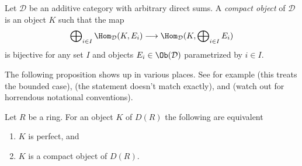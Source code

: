 \begin{definition}
\label{definition-compact-object}
Let $\mathcal{D}$ be an additive category with arbitrary direct
sums. A {\it compact object} of $\mathcal{D}$ is an object $K$
such that the map
$$
\bigoplus\nolimits_{i \in I} \Hom_{\mathcal{D}}(K, E_i)
\longrightarrow
\Hom_{\mathcal{D}}(K, \bigoplus\nolimits_{i \in I} E_i)
$$
is bijective for any set $I$ and objects
$E_i \in \Ob(\mathcal{D})$ parametrized by $i \in I$.
\end{definition}

\noindent
The following proposition shows up in various places. See for example
\cite[proof of Proposition 6.3]{Rickard} (this treats the bounded case),
\cite[Theorem 2.4.3]{TT} (the statement doesn't match exactly), and
\cite[Proposition 6.4]{Bokstedt-Neeman} (watch out for
horrendous notational conventions).

\begin{proposition}
\label{proposition-perfect-is-compact}
Let $R$ be a ring. For an object $K$ of $D(R)$ the following are equivalent
\begin{enumerate}
\item $K$ is perfect, and
\item $K$ is a compact object of $D(R)$.
\end{enumerate}
\end{proposition}

